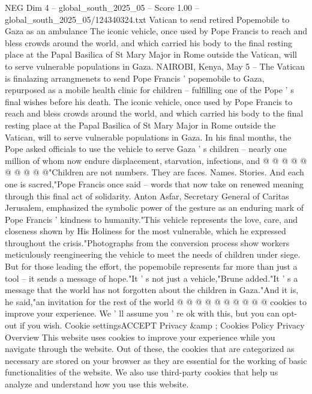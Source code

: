 \begin{textsample}{NEG Dim 4 – global\_south\_2025\_05 – Score 1.00 – global\_south\_2025\_05/124340324.txt}  \label{ex:f4_neg_366}
Vatican to send retired Popemobile to Gaza as an ambulance The iconic vehicle, once used by Pope Francis to reach and bless crowds around the world, and which carried his body to the final resting place at the Papal Basilica of St Mary Major in Rome outside the Vatican, will to serve vulnerable populations in Gaza.
NAIROBI, Kenya, May 5 -- The Vatican is finalazing arrangmenets to send Pope Francis ' popemobile to Gaza, repurposed as a mobile health clinic for children -- fulfilling one of the Pope ' s final wishes before his death.
The iconic vehicle, once used by Pope Francis to reach and bless crowds around the world, and which carried his body to the final resting place at the Papal Basilica of St Mary Major in Rome outside the Vatican, will to serve vulnerable populations in Gaza.
In his final months, the Pope asked officials to use the vehicle to serve Gaza ' s children -- nearly one million of whom now endure displacement, starvation, infections, and @ @ @ @ @ @ @ @ @ @"Children are not numbers.
They are faces.
Names.
Stories.
And each one is sacred,"Pope Francis once said -- words that now take on renewed meaning through this final act of solidarity.
Anton Asfar, Secretary General of Caritas Jerusalem, emphasized the symbolic power of the gesture as an enduring mark of Pope Francis ' kindness to humanity."This vehicle represents the love, care, and closeness shown by His Holiness for the most vulnerable, which he expressed throughout the crisis."Photographs from the conversion process show workers meticulously reengineering the vehicle to meet the needs of children under siege.
But for those leading the effort, the popemobile represents far more than just a tool -- it sends a message of hope."It ' s not just a vehicle,"Brune added."It ' s a message that the world has not forgotten about the children in Gaza."And it is, he said,"an invitation for the rest of the world @ @ @ @ @ @ @ @ @ @ cookies to improve your experience.
We ' ll assume you ' re ok with this, but you can opt-out if you wish.
Cookie settingsACCEPT Privacy \&amp ; Cookies Policy Privacy Overview This website uses cookies to improve your experience while you navigate through the website.
Out of these, the cookies that are categorized as necessary are stored on your browser as they are essential for the working of basic functionalities of the website.
We also use third-party cookies that help us analyze and understand how you use this website.

\end{textsample}
